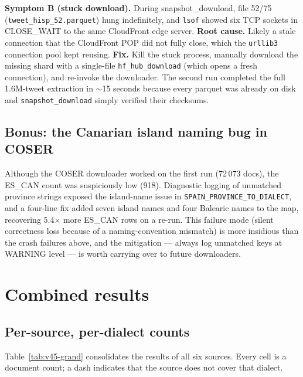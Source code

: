 \documentclass[11pt,a4paper]{article}
\begin{document}
\textbf{Symptom B (stuck download).} During snapshot\_download, file
52/75 (\texttt{tweet\_hisp\_52.parquet}) hung indefinitely, and
\texttt{lsof} showed six TCP sockets in CLOSE\_WAIT to the same
CloudFront edge server.
\textbf{Root cause.} Likely a stale connection that the CloudFront POP
did not fully close, which the \texttt{urllib3} connection pool kept
reusing.
\textbf{Fix.} Kill the stuck process, manually download the missing
shard with a single-file \texttt{hf\_hub\_download} (which opens a fresh
connection), and re-invoke the downloader. The second run completed the
full 1.6M-tweet extraction in $\sim$15 seconds because every parquet was
already on disk and \texttt{snapshot\_download} simply verified their
checksums.

\subsection{Bonus: the Canarian island naming bug in COSER}

Although the COSER downloader worked on the first run (72\,073 docs),
the ES\_CAN count was suspiciously low (918). Diagnostic logging of
unmatched province strings exposed the island-name issue in
\texttt{SPAIN\_PROVINCE\_TO\_DIALECT}, and a four-line fix added seven
island names and four Balearic names to the map, recovering 5.4$\times$
more ES\_CAN rows on a re-run. This failure mode (silent correctness
loss because of a naming-convention mismatch) is more insidious than the
crash failures above, and the mitigation --- always log unmatched keys
at WARNING level --- is worth carrying over to future downloaders.

\section{Combined results}

\subsection{Per-source, per-dialect counts}

Table~\ref{tab:v45-grand} consolidates the results of all six sources.
Every cell is a document count; a dash indicates that the source does
not cover that dialect.
\end{document}
